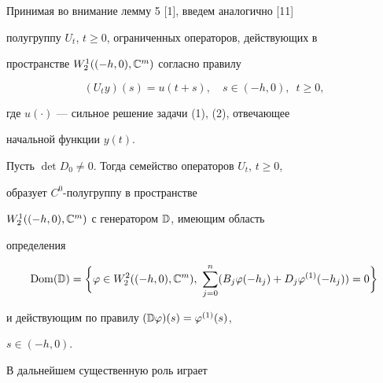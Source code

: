  


Принимая во внимание лемму 5 [1], введем аналогично [11] 


полугруппу $U_t$, $t\ge0$, ограниченных операторов, действующих в 


пространстве $W^{1}_{2}((-h,0),\Bbb C^m)$ согласно правилу 


$$ 


(U_t y)(s)=u(t+s),\quad s\in (-h,0),\ \; t\ge0, 


$$ 


где $u(\cdot)$ --- сильное решение задачи (1), (2), отвечающее 


начальной функции $y(t)$. 


 


\begin{lem} 


Пусть $\det D_0\ne0$. Тогда семейство операторов $U_t$, $t\ge0$, 


образует $C^0$-полугруппу в пространстве 


$W^{1}_{2}((-h,0),\Bbb C^m)$ с генератором $\Bbb D$, имеющим область 


определения 


$$ 


\Dom(\Bbb D)=\bigg\{\varphi\in W^{2}_{2}((-h,0),\Bbb C^m),\ 


\sum^n_{j=0}(B_j\varphi(-h_j)+D_j\varphi^{(1)}(-h_j))=0\bigg\} 


$$ 


и действующим по правилу $(\Bbb D\varphi)(s)=\varphi^{(1)}(s)$, 


$s\in(-h,0)$. 


\end{lem}


 


В дальнейшем существенную роль играет


 


